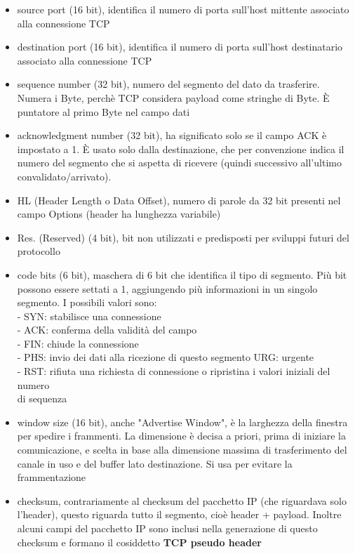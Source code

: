 \documentclass[11pt, oneside]{article}   	%
\begin{document}
\begin{itemize}

\item source port (16 bit), identifica il numero di porta sull'host mittente associato alla connessione TCP
\item destination port (16 bit), identifica il numero di porta sull'host destinatario associato alla connessione TCP
\item sequence number (32 bit), numero del segmento del dato da trasferire. Numera i Byte, perchè TCP considera payload come stringhe di Byte. È puntatore al primo Byte nel campo dati
\item acknowledgment number (32 bit), ha significato solo se il campo ACK è impostato a 1. È usato solo dalla destinazione, che per convenzione indica il numero del segmento che si aspetta di ricevere (quindi successivo all'ultimo convalidato/arrivato).
\item HL (Header Length o Data Offset), numero di parole da 32 bit presenti nel campo Options (header ha lunghezza variabile)
\item Res. (Reserved) (4 bit), bit non utilizzati e predisposti per sviluppi futuri del protocollo
\item code bits (6 bit), maschera di 6 bit che identifica il tipo di segmento. Più bit possono essere settati a 1, aggiungendo più informazioni in un singolo segmento. I possibili valori sono:\\
- SYN: stabilisce una connessione\\
- ACK: conferma della validità del campo\\
- FIN: chiude la connessione\\
- PHS: invio dei dati alla ricezione di questo segmento URG: urgente\\
- RST: rifiuta una richiesta di connessione o ripristina i valori iniziali del numero\\
di sequenza
\item window size (16 bit), anche "Advertise Window", è la larghezza della finestra per spedire i frammenti. La dimensione è decisa a priori, prima di iniziare la comunicazione, e scelta in base alla dimensione massima di trasferimento del canale in uso e del buffer lato destinazione. Si usa per evitare la frammentazione 
\item checksum, contrariamente al checksum del pacchetto IP (che riguardava solo l'header), questo riguarda tutto il segmento, cioè header + payload. Inoltre alcuni campi del pacchetto IP sono inclusi nella generazione di questo checksum e formano il cosiddetto \textbf{TCP pseudo header}

\end{itemize}
\end{document}
